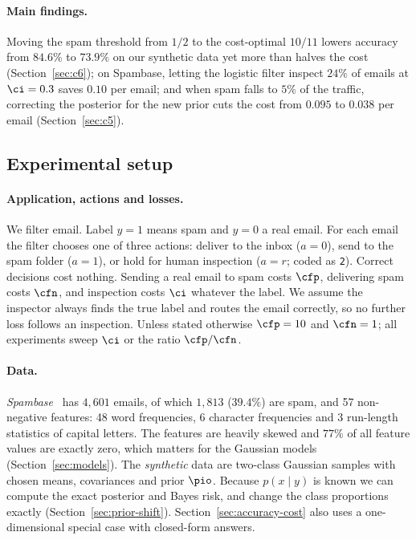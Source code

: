 \paragraph{Main findings.}
Moving the spam threshold from $1/2$ to the cost-optimal $10/11$ lowers accuracy from $84.6\%$ to $73.9\%$
on our synthetic data yet more than halves the cost (Section~\ref{sec:c6}); on Spambase, letting the
logistic filter inspect $24\%$ of emails at $\ci=0.3$ saves $0.10$ per email; and when spam falls to
$5\%$ of the traffic, correcting the posterior for the new prior cuts the cost from $0.095$ to $0.038$
per email (Section~\ref{sec:c5}).

\subsection{Experimental setup}
\label{sec:setup}

\paragraph{Application, actions and losses.}
We filter email. Label $y=1$ means spam and $y=0$ a real email. For each email the filter
chooses one of three actions: deliver to the inbox ($a=0$), send to the spam folder ($a=1$), or
hold for human inspection ($a=r$; coded as \texttt{2}). Correct decisions cost nothing. Sending
a real email to spam costs $\cfp$, delivering spam costs $\cfn$, and inspection costs $\ci$
whatever the label. We assume the inspector always finds the true label and routes the email
correctly, so no further loss follows an inspection. Unless stated otherwise $\cfp=10$ and $\cfn=1$;
all experiments sweep $\ci$ or the ratio $\cfp/\cfn$.

\paragraph{Data.}
\emph{Spambase}~\cite{spambase} has $4{,}601$ emails, of which $1{,}813$ ($39.4\%$) are spam, and
57 non-negative features: 48 word frequencies, 6 character frequencies and 3 run-length
statistics of capital letters. The features are heavily skewed and $77\%$ of all feature values are
exactly zero, which matters for the Gaussian models (Section~\ref{sec:models}).
The \emph{synthetic} data are two-class Gaussian samples with chosen means, covariances and
prior $\pio$. Because $p(x\mid y)$ is known we can compute the exact posterior and Bayes risk,
and change the class proportions exactly (Section~\ref{sec:prior-shift}). Section~\ref{sec:accuracy-cost}
also uses a one-dimensional special case with closed-form answers.

